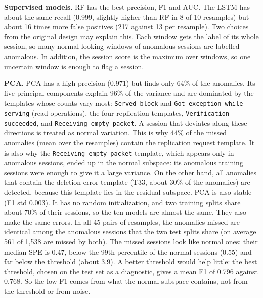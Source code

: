 \documentclass[10pt, conference]{IEEEtran}
\renewcommand{\paragraph}[1]{\noindent\textbf{#1}.}
\newcommand{\tpl}[1]{\texttt{\small #1}}
\begin{document}
\paragraph{Supervised models} RF has the best precision, F1 and AUC. The LSTM has about the same recall (0.999, slightly higher than RF in 8 of 10 resamples) but about 16 times more false positives (217 against 13 per resample). Two choices from the original design may explain this. Each window gets the label of its whole session, so many normal-looking windows of anomalous sessions are labelled anomalous. In addition, the session score is the maximum over windows, so one uncertain window is enough to flag a session.

\paragraph{PCA} PCA has a high precision (0.971) but finds only 64\% of the anomalies. Its five principal components explain 96\% of the variance and are dominated by the templates whose counts vary most: \tpl{Served block} and \tpl{Got exception while serving} (read operations), the four replication templates, \tpl{Verification succeeded}, and \tpl{Receiving empty packet}. A session that deviates along these directions is treated as normal variation. This is why 44\% of the missed anomalies (mean over the resamples) contain the replication request template. It is also why the \tpl{Receiving empty packet} template, which appears only in anomalous sessions, ended up in the normal subspace: its anomalous training sessions were enough to give it a large variance. On the other hand, all anomalies that contain the deletion error template (T33, about 30\% of the anomalies) are detected, because this template lies in the residual subspace. PCA is also stable (F1 std 0.003). It has no random initialization, and two training splits share about 70\% of their sessions, so the ten models are almost the same. They also make the same errors. In all 45 pairs of resamples, the anomalies missed are identical among the anomalous sessions that the two test splits share (on average 561 of 1,538 are missed by both). The missed sessions look like normal ones: their median SPE is 0.47, below the 99th percentile of the normal sessions (0.55) and far below the threshold (about 3.9). A better threshold would help little: the best threshold, chosen on the test set as a diagnostic, gives a mean F1 of 0.796 against 0.768. So the low F1 comes from what the normal subspace contains, not from the threshold or from noise.
\end{document}
